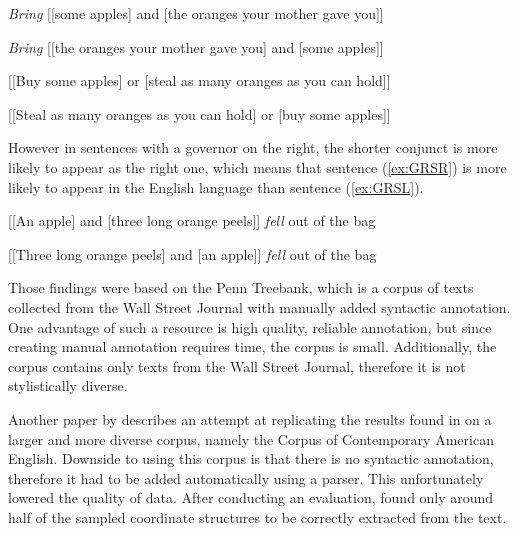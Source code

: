 \begin{exe}

\ex\label{ex:GL}
\begin{xlist}
\ex\label{ex:GLSL}
\textsl{Bring} [[some apples] and [the oranges your mother gave you]]

\ex\label{ex:GLSR}
\textsl{Bring} [[the oranges your mother gave you] and [some apples]]
\end{xlist}

\ex\label{ex:GN}
\begin{xlist}
\ex\label{ex:GNSL}
[[Buy some apples] or [steal as many oranges as you can hold]]

\ex\label{ex:GNSR}
[[Steal as many oranges as you can hold] or [buy some apples]]
\end{xlist}

\end{exe}

However in sentences with a governor on the right, the shorter conjunct is more likely to appear as the right one, which means that sentence (\ref{ex:GRSR}) is more likely to appear in the English language than sentence (\ref{ex:GRSL}).

\begin{exe}

\ex\label{ex:GR}
\begin{xlist}
\ex\label{ex:GRSL}
[[An apple] and [three long orange peels]] \textsl{fell} out of the bag

\ex\label{ex:GRSR}
[[Three long orange peels] and [an apple]] \textsl{fell} out of the bag
\end{xlist}

\end{exe}

Those findings were based on the Penn Treebank, which is a corpus of texts collected from the Wall Street Journal with manually added syntactic annotation. One advantage of such a resource is high quality, reliable annotation, but since creating manual annotation requires time, the corpus is small. Additionally, the corpus contains only texts from the Wall Street Journal, therefore it is not stylistically diverse. 

Another paper by \cite{pbg2023} describes an attempt at replicating the results found in \cite{prz:woz:23} on a larger and more diverse corpus, namely the Corpus of Contemporary American English. Downside to using this corpus is that there is no syntactic annotation, therefore it had to be added automatically using a parser. This unfortunately lowered the quality of data. After conducting an evaluation, \cite{pbg2023} found only around half of the sampled coordinate structures to be correctly extracted from the text. 

